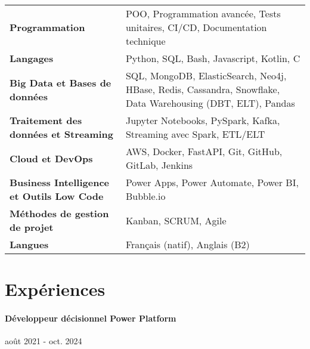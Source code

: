 \documentclass{article}
\begin{document}
\begin{tabularx}{\textwidth}{@{}lX@{}}

  \textbf{Programmation} & POO, Programmation avancée, Tests unitaires, CI/CD, Documentation technique \\
  \addlinespace[5pt] %

  \textbf{Langages} & Python, SQL, Bash, Javascript, Kotlin, C \\
  \addlinespace[5pt] %

  \textbf{Big Data et Bases de données} & SQL, MongoDB, ElasticSearch, Neo4j, HBase, Redis, Cassandra, Snowflake, Data Warehousing (DBT, ELT), Pandas \\
  \addlinespace[5pt] %

  \textbf{Traitement des données et Streaming} & Jupyter Notebooks, PySpark, Kafka, Streaming avec Spark, ETL/ELT \\
  \addlinespace[5pt] %

  \textbf{Cloud et DevOps} & AWS, Docker, FastAPI, Git, GitHub, GitLab, Jenkins \\
  \addlinespace[5pt] %

  \textbf{Business Intelligence et Outils Low Code} & Power Apps, Power Automate, Power BI, Bubble.io \\
  \addlinespace[5pt] %

  \textbf{Méthodes de gestion de projet} & Kanban, SCRUM, Agile \\
  \addlinespace[5pt] %

  \textbf{Langues} & Français (natif), Anglais (B2)
\end{tabularx}


\vspace{4ex}
\hrulefill
\section*{Expériences}

\paragraph{Développeur décisionnel Power Platform}\hspace*{\fill}août 2021 - oct. 2024
\end{document}

